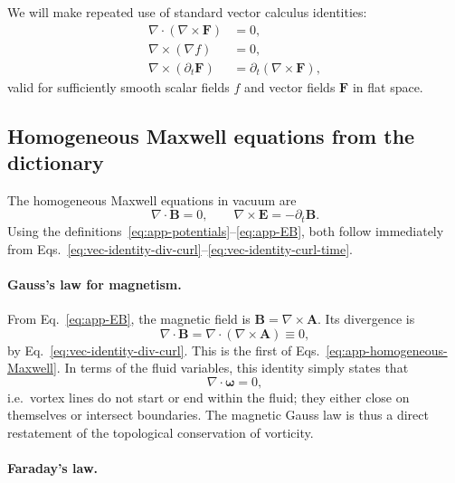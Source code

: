 \documentclass[11pt]{article}
\begin{document}
We will make repeated use of standard vector calculus identities:
\begin{align}
\nabla \cdot (\nabla \times \mathbf{F}) &= 0,
\label{eq:vec-identity-div-curl}\\[4pt]
\nabla \times (\nabla f) &= 0,
\label{eq:vec-identity-curl-grad}\\[4pt]
\nabla \times (\partial_t \mathbf{F})
&= \partial_t (\nabla \times \mathbf{F}),
\label{eq:vec-identity-curl-time}
\end{align}
valid for sufficiently smooth scalar fields $f$ and vector fields $\mathbf{F}$ in flat space.

\subsection{Homogeneous Maxwell equations from the dictionary}

The homogeneous Maxwell equations in vacuum are
\begin{equation}
\nabla \cdot \mathbf{B} = 0,
\qquad
\nabla \times \mathbf{E} = -\partial_t \mathbf{B}.
\label{eq:app-homogeneous-Maxwell}
\end{equation}
Using the definitions~\eqref{eq:app-potentials}--\eqref{eq:app-EB}, both follow immediately from Eqs.~\eqref{eq:vec-identity-div-curl}--\eqref{eq:vec-identity-curl-time}.

\paragraph{Gauss's law for magnetism.}

From Eq.~\eqref{eq:app-EB}, the magnetic field is $\mathbf{B} = \nabla\times\mathbf{A}$.  Its divergence is
\begin{equation}
\nabla \cdot \mathbf{B}
= \nabla \cdot (\nabla \times \mathbf{A})
\equiv 0,
\end{equation}
by Eq.~\eqref{eq:vec-identity-div-curl}.  This is the first of Eqs.~\eqref{eq:app-homogeneous-Maxwell}.  In terms of the fluid variables, this identity simply states that
\begin{equation}
\nabla \cdot \boldsymbol{\omega} = 0,
\end{equation}
i.e.\ vortex lines do not start or end within the fluid; they either close on themselves or intersect boundaries.  The magnetic Gauss law is thus a direct restatement of the topological conservation of vorticity.

\paragraph{Faraday's law.}
\end{document}
